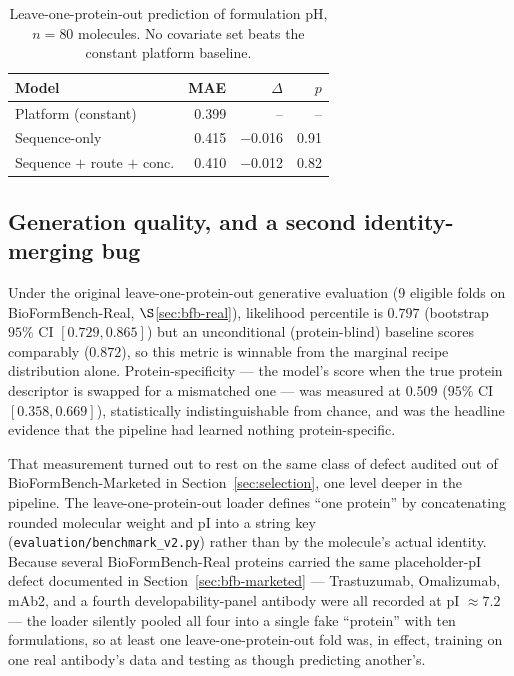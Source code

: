 \documentclass[twocolumn,10pt]{article}
\begin{document}
\begin{table}[t]
  \centering
  \caption{Leave-one-protein-out prediction of formulation pH, $n=80$
  molecules. No covariate set beats the constant platform baseline.}
  \label{tab:platform}
  \small
  \begin{tabular}{lrrr}
    \toprule
    \textbf{Model} & \textbf{MAE} & \boldmath$\Delta$ & \textbf{$p$} \\
    \midrule
    Platform (constant)     & 0.399 & --      & --    \\
    Sequence-only           & 0.415 & $-$0.016 & 0.91 \\
    Sequence $+$ route $+$ conc. & 0.410 & $-$0.012 & 0.82 \\
    \bottomrule
  \end{tabular}
\end{table}

\subsection{Generation quality, and a second identity-merging bug}
\label{sec:identityfix}

Under the original leave-one-protein-out generative evaluation (9 eligible folds
on BioFormBench-Real, $\S$\ref{sec:bfb-real}), likelihood percentile is $0.797$
(bootstrap $95\%$ CI $[0.729, 0.865]$) but an unconditional (protein-blind)
baseline scores comparably ($0.872$), so this metric is winnable from the
marginal recipe distribution alone. Protein-specificity --- the model's score
when the true protein descriptor is swapped for a mismatched one --- was
measured at $0.509$ ($95\%$ CI $[0.358, 0.669]$), statistically indistinguishable
from chance, and was the headline evidence that the pipeline had learned nothing
protein-specific.

That measurement turned out to rest on the same class of defect audited out of
BioFormBench-Marketed in Section~\ref{sec:selection}, one level deeper in the
pipeline. The leave-one-protein-out loader defines ``one protein'' by
concatenating rounded molecular weight and pI into a string key
(\texttt{evaluation/benchmark\_v2.py}) rather than by the molecule's actual
identity. Because several BioFormBench-Real proteins carried the same
placeholder-pI defect documented in Section~\ref{sec:bfb-marketed} --- Trastuzumab,
Omalizumab, mAb2, and a fourth developability-panel antibody were all recorded at
pI $\approx 7.2$ --- the loader silently pooled all four into a single fake
``protein'' with ten formulations, so at least one leave-one-protein-out fold was,
in effect, training on one real antibody's data and testing as though predicting
another's.
\end{document}
